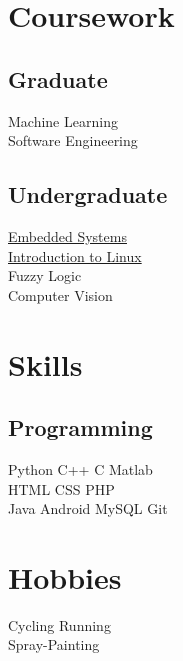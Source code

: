 \documentclass[]{deedy-resume-openfont}
\begin{document}
\begin{minipage}[t]{0.33\textwidth}

\section{Coursework}
\subsection{Graduate}
Machine Learning \\
Software Engineering \\
\sectionsep

\subsection{Undergraduate}
\href{https://s3.amazonaws.com/verify.edx.org/downloads/da8f6310cc1d4955b810a45a3f79d526/Certificate.pdf}{Embedded Systems} \\
\href{https://s3.amazonaws.com/verify.edx.org/downloads/6ec0a7e04dd64df5aa47a653321fbf57/Certificate.pdf}{Introduction to Linux} \\
Fuzzy Logic \\
Computer Vision \\
\sectionsep


\section{Skills}
\subsection{Programming}
Python \textbullet{}   C++ \textbullet{} C \textbullet{} Matlab \\
HTML \textbullet{} CSS \textbullet{} PHP \\ 
Java \textbullet{} Android \textbullet{} MySQL \textbullet{} Git
\sectionsep


\section{Hobbies}
Cycling \textbullet{}  Running \\ 
Spray-Painting \\


%
%

\end{minipage} 
\end{document}
